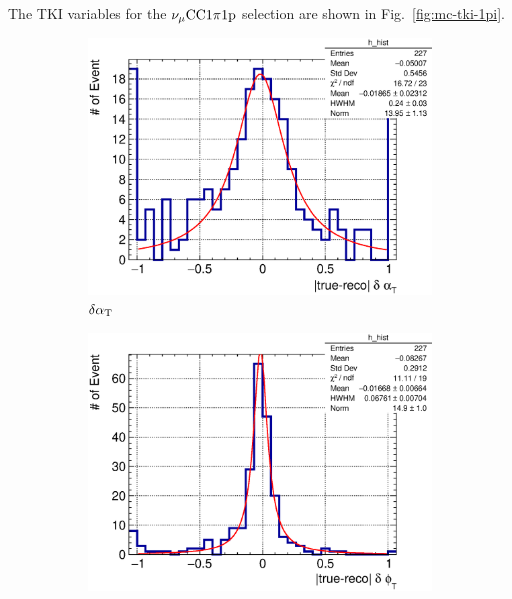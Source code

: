      The TKI variables for the $\nu_{\mu}\textrm{CC}1\pi1\textrm{p}$ selection are shown in Fig.~\ref{fig:mc-tki-1pi}.
     \begin{figure}
          \begin{subfigure}[b]{\dbfigwid\textwidth}
               \centering
               \includegraphics[width=\textwidth]{figures/perf/tki/SFGpTPCmu_dalphat_rat_hist_al14.eps}
               \caption{$\delta\alpha_\textrm{T}$}
               \label{subfig:1pi-dalpha}
          \end{subfigure}         
          \begin{subfigure}[b]{\dbfigwid\textwidth}
               \centering
               \includegraphics[width=\textwidth]{figures/perf/tki/SFGpTPCmu_dphit_rat_hist_al14.eps}

\end{subfigure}
\end{figure}
